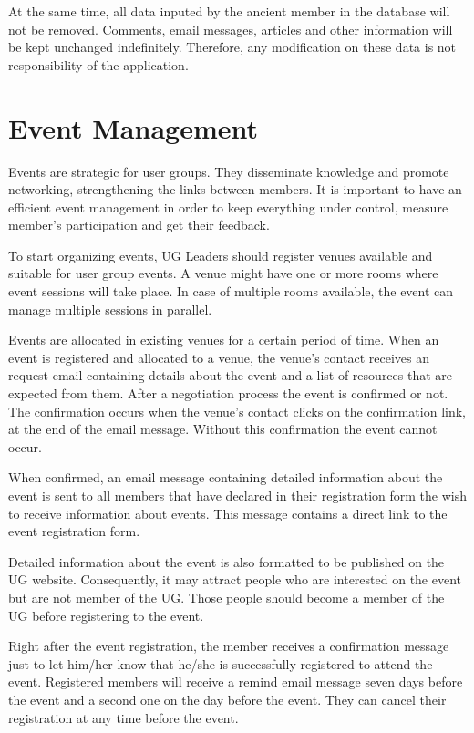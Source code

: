 \documentclass[10pt,a4paper]{report}
\begin{document}
At the same time, all data inputed by the ancient member in the database will not be removed. Comments, email messages, articles and other information will be kept unchanged indefinitely. Therefore, any modification on these data is not responsibility of the application.

\chapter{Event Management}

Events are strategic for user groups. They disseminate knowledge and promote networking, strengthening the links between members. It is important to have an efficient event management in order to keep everything under control, measure member's participation and get their feedback.

To start organizing events, UG Leaders should register venues available and suitable for user group events. A venue might have one or more rooms where event sessions will take place. In case of multiple rooms available, the event can manage multiple sessions in parallel.

Events are allocated in existing venues for a certain period of time. When an event is registered and allocated to a venue, the venue's contact receives an request email containing details about the event and a list of resources that are expected from them. After a negotiation process the event is confirmed or not. The confirmation occurs when the venue's contact clicks on the confirmation link, at the end of the email message. Without this confirmation the event cannot occur.

When confirmed, an email message containing detailed information about the event is sent to all members that have declared in their registration form the wish to receive information about events. This message contains a direct link to the event registration form.

Detailed information about the event is also formatted to be published on the UG website. Consequently, it may attract people who are interested on the event but are not member of the UG. Those people should become a member of the UG before registering to the event.

Right after the event registration, the member receives a confirmation message just to let him/her know that he/she is successfully registered to attend the event. Registered members will receive a remind email message seven days before the event and a second one on the day before the event. They can cancel their registration at any time before the event.
\end{document}

